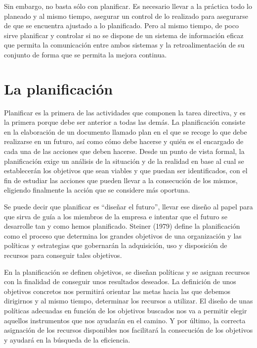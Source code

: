 \documentclass[
]{krantz}
\begin{document}
Sin embargo, no basta sólo con planificar. Es necesario llevar a la práctica todo lo planeado y al mismo tiempo, asegurar un control de lo realizado para asegurarse de que se encuentra ajustado a lo planificado. Pero al mismo tiempo, de poco sirve planificar y controlar si no se dispone de un sistema de información eficaz que permita la comunicación entre ambos sistemas y la retroalimentación de su conjunto de forma que se permita la mejora continua.

\hypertarget{la-planificaciuxf3n}{%
\section{La planificación}\label{la-planificaciuxf3n}}

Planificar es la primera de las actividades que componen la tarea directiva, y es la primera porque debe ser anterior a todas las demás. La planificación consiste en la elaboración de un documento llamado plan en el que se recoge lo que debe realizarse en un futuro, así como cómo debe hacerse y quién es el encargado de cada una de las acciones que deben hacerse. Desde un punto de vista formal, la planificación exige un análisis de la situación y de la realidad en base al cual se establecerán los objetivos que sean viables y que puedan ser identificados, con el fin de estudiar las acciones que pueden llevar a la consecución de los mismos, eligiendo finalmente la acción que se considere más oportuna.

Se puede decir que planificar es ``diseñar el futuro'', llevar ese diseño al papel para que sirva de guía a los miembros de la empresa e intentar que el futuro se desarrolle tan y como hemos planificado. Steiner (1979) define la planificación como el proceso que determina los grandes objetivos de una organización y las políticas y estrategias que gobernarán la adquisición, uso y disposición de recursos para conseguir tales objetivos.

En la planificación se definen objetivos, se diseñan políticas y se asignan recursos con la finalidad de conseguir unos resultados deseados. La definición de unos objetivos concretos nos permitirá orientar las metas hacia las que debemos dirigirnos y al mismo tiempo, determinar los recursos a utilizar. El diseño de unas políticas adecuadas en función de los objetivos buscados nos va a permitir elegir aquellos instrumentos que nos ayudarán en el camino. Y por último, la correcta asignación de los recursos disponibles nos facilitará la consecución de los objetivos y ayudará en la búsqueda de la eficiencia.
\end{document}
